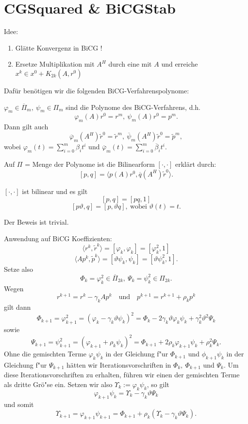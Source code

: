 \section{CGSquared \& BiCGStab}
Idee:
\begin{enumerate}
\item Gl\"atte Konvergenz in BiCG !
\item Ersetze Multiplikation mit $A^H$ durch eine mit $A$ und erreiche
 $x^k \in x^0 + K_{2k}(A,r^0)$
\end{enumerate}
Dafür ben\"otigen wir die folgenden BiCG-Verfahrenspolynome:

\begin{defn}
$\varphi_m \in \overline{\Pi}_m,\ \psi_m \in \Pi_m$ sind die Polynome des BiCG-Verfahrens, d.h.
\[
\varphi_m(A)r^0=r^m,\ \psi_m(A)r^0=p^m.
\]
Dann gilt auch
\[
\overline{\varphi}_m(A^H)\tilde{r}^0=\tilde{r}^m,\ \overline{\psi}_m(A^H)\tilde{r}^0=\tilde{p}^m,
\]
wobei $\varphi_m(t)= \sum_{i=0}^m \beta_i t^i$ und $\overline{\varphi}_m(t)= \sum_{i=0}^m \overline{\beta}_i t^i$.
\end{defn}

\begin{defn}
Auf $\Pi$ = Menge der Polynome ist die Bilinearform $\left[ \cdot , \cdot \right]$ erkl\"art durch:
\[
\left[p,q \right] = \langle p(A)r^0, \overline{q}(A^H)\tilde{r}^0 \rangle.
\]
\end{defn}

\begin{lem}
$\left[ \cdot , \cdot \right]$ ist bilinear und es gilt
\[
\left[p,q \right] = \left[ pq,1 \right]
\]
\[
\left[p \vartheta,q \right] = \left[ p,\vartheta q \right],\ \text{wobei } \vartheta(t)=t.
\]
\end{lem}
Der Beweis ist trivial.
\medskip


Anwendung auf BiCG Koeffizienten:
\[
\langle r^k, \tilde{r}^k \rangle = \left[ \varphi_k, \varphi_k \right] = \left[ \varphi_k^2,1 \right]
\]
\[
\langle Ap^k, \tilde{p}^k \rangle = \left[ \vartheta \psi_k, \psi_k \right] = \left[ \vartheta \psi_k^2,1 \right].
\]
Setze also
\[
\Phi_k = \varphi_k^2 \in \overline{\Pi}_{2k},\ \Psi_k = \psi_k^2 \in \Pi_{2k}.
\]
Wegen
\[r^{k+1} = r^{k} - \gamma_kAp^k \quad\text{und}\quad p^{k+1} = r^{k+1} + \rho_kp^k\]
gilt dann
\[
\Phi_{k+1} = \varphi_{k+1}^2 = \left( \varphi_k - \gamma_k \vartheta \psi_k \right)^2 = \Phi_k -2 \gamma_k \vartheta \varphi_k \psi_k + \gamma_k^2 \vartheta^2 \Psi_k
\]
sowie
\[
\Psi_{k+1} = \psi_{k+1}^2 = \left( \varphi_{k+1} + \rho_k \psi_k \right)^2 = \Phi_{k+1} + 2 \rho_k \varphi_{k+1} \psi_k + \rho_k^2 \Psi_k.
\]
Ohne die gemischten Terme $\varphi_k\psi_k$ in der Gleichung f"ur $\Phi_{k+1}$ und $\phi_{k+1}\psi_k$ in der Gleichung f"ur $\Psi_{k+1}$ h\"atten wir Iterationsvorschriften in $\Phi_k,~\Phi_{k+1}$ und $\Psi_k$. Um diese Iterationsvorschriften zu erhalten, f\"uhren wir einen der gemischten Terme als dritte Gr\"o"se ein. Setzen wir also $\Upsilon_k := \varphi_k\psi_k$, so gilt
\[
\varphi_{k+1} \psi_k = \Upsilon_k - \gamma_k \vartheta \Psi_k
\]
und somit
\[
\Upsilon_{k+1}=\varphi_{k+1} \psi_{k+1} = \Phi_{k+1} + \rho_k \left(\Upsilon_k - \gamma_k \vartheta \Psi_k \right).
\]

